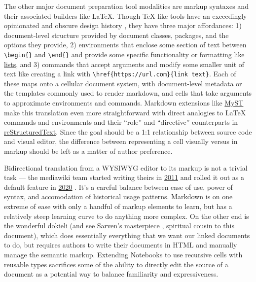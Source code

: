 The other major document preparation tool modalities are markup syntaxes
and their associated builders like LaTeX. Though TeX-like tools have an
exceedingly opinionated and obscure design history \citep{knuthTeXbook1986} , they have three major affordances: 1)
document-level structure provided by document classes, packages, and the
options they provide, 2) environments that enclose some section of text
between \texttt{\textbackslash{}begin\{\}} and
\texttt{\textbackslash{}end\{\}} and provide some specific functionality
or formatting like
\href{https://www.overleaf.com/learn/latex/Lists}{lists}, and 3)
commands that accept arguments and modify some smaller unit of text like
creating a link with
\texttt{\textbackslash{}href\{https://url.com\}\{link\ text\}}. Each of
these maps onto a cellular document system, with document-level metadata
or the templates commonly used to render markdown, and cells that take
arguments to approximate environments and commands. Markdown extensions
like \href{https://myst-parser.readthedocs.io/en/latest/}{MyST} \citep{dupreAdvertisingNewInfrastructures2022}  make this translation
even more straightforward with direct analogies to LaTeX commands and
environments and their ``role'' and ``directive'' counterparts in
\href{https://www.sphinx-doc.org/en/master/usage/restructuredtext/basics.html}{reStructuredText}.
Since the goal should be a 1:1 relationship between source code and
visual editor, the difference between representing a cell visually
versus in markup should be left as a matter of author preference.

Bidirectional translation from a WYSIWYG editor to its markup is not a
trivial task --- the mediawiki team started writing theirs in
\href{https://www.mediawiki.org/wiki/VisualEditor}{2011} and rolled it
out as a default feature in
\href{https://en.wikipedia.org/wiki/MediaWiki_version_history}{2020}
\citep{forresterInventingWeGo2012} . It's a careful balance
between ease of use, power of syntax, and accomodation of historical
usage patterns. Markdown is on one extreme of ease with only a handful
of markup elements to learn, but has a relatively steep learning curve
to do anything more complex. On the other end is the wonderful
\href{https://dokie.li/}{dokieli} \citep{capadisliDecentralisedAuthoringAnnotations2017}  (and see Sarven's
\href{https://csarven.ca/linked-research-decentralised-web}{masterpiece}
\citep{capadisliLinkedResearchDecentralised2019} , spiritual
cousin to this document), which does essentially everything that we want
our linked documents to do, but requires authors to write their
documents in HTML and manually manage the semantic markup. Extending
Notebooks to use recursive cells with reusable types sacrifices some of
the ability to directly edit the source of a document as a potential way
to balance familiarity and expressiveness.

